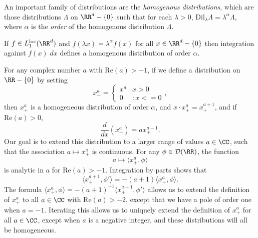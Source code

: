 An important family of distributions are the \emph{homogenous distributions}, which are those distributions $\Lambda$ on $\RR^d - \{ 0 \}$ such that for each $\lambda > 0$, $\text{Dil}_\lambda \Lambda = \lambda^\alpha \Lambda$, where $\alpha$ is the \emph{order} of the homogenous distribution $\Lambda$.

\begin{example}
  If $f \in L_1^{\text{loc}}(\RR^d)$ and $f(\lambda x) = \lambda^\alpha f(x)$ for all $x \in \RR^d - \{ 0 \}$ then integration against $f(x)\; dx$ defines a homogenous distribution of order $\alpha$.
\end{example}

\begin{example}
  For any complex number $a$ with $\text{Re}(a) > -1$, if we define a distribution on $\RR - \{ 0 \}$ by setting
  \[ x^a_+ = \begin{cases} x^a & x > 0 \\ 0 &: x <= 0 \end{cases}, \]
  then $x^a_+$ is a homogeneous distribution of order $\alpha$, and $x \cdot x^a_+ = x^{a+1}_+$, and if $\text{Re}(a) > 0$,
  \[ \frac{d}{dx} \left( x^a_+ \right) = a x^{a-1}_+. \]
  Our goal is to extend this distribution to a larger range of values $a \in \CC$, such that the association $a \mapsto x^a_+$ is continuous. For any $\phi \in \mathcal{D}(\RR)$, the function
  \[ a \mapsto \langle x^a_+, \phi \rangle \]
  is analytic in $a$ for $\text{Re}(a) > -1$. Integration by parts shows that
  \[ \langle x^{a+1}_+, \phi' \rangle = - (a+1) \langle x^a_+, \phi \rangle. \]
  The formula $\langle x^a_+, \phi \rangle = -(a+1)^{-1} \langle x^{a+1}_+, \phi' \rangle$ allows us to extend the definition of $x^a_+$ to all $a \in \CC$ with $\text{Re}(a) > -2$, except that we have a pole of order one when $a = -1$. Iterating this allows us to uniquely extend the definition of $x^a_+$ for all $a \in \CC$, except when $a$ is a negative integer, and these distributions will all be homogeneous.


\end{example}
